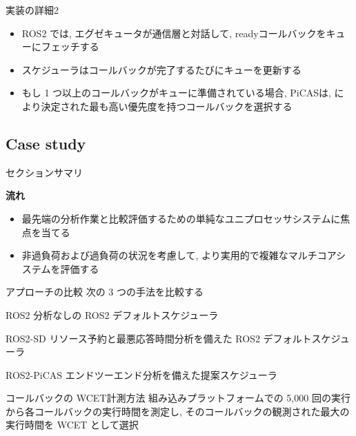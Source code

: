 \begin{frame}{実装の詳細2}
    \begin{itemize}
        \item ROS2 では, エグゼキュータが通信層と対話して, readyコールバックをキューにフェッチする
        \item スケジューラはコールバックが完了するたびにキューを更新する
        \item もし 1 つ以上のコールバックがキューに準備されている場合, PiCASは,  により決定された最も高い優先度を持つコールバックを選択する
    \end{itemize}
\end{frame}


\subsection{Case study}
\label{ssec: case study}

\begin{frame}{セクションサマリ}
    \begin{itembox}[l]{\textbf{流れ}}
        \begin{itemize}
            \item 最先端の分析作業と比較評価するための単純なユニプロセッサシステムに焦点を当てる
            \item 非過負荷および過負荷の状況を考慮して, より実用的で複雑なマルチコアシステムを評価する
        \end{itemize}
    \end{itembox}
\end{frame}

\begin{frame}{アプローチの比較}
    次の 3 つの手法を比較する
    \begin{block}{ROS2}
        分析なしの ROS2 デフォルトスケジューラ
    \end{block}
    \begin{block}{ROS2-SD}
        リソース予約と最悪応答時間分析を備えた ROS2 デフォルトスケジューラ~\cite{casini2019response}
    \end{block}
    \begin{block}{ROS2-PiCAS}
        エンドツーエンド分析を備えた提案スケジューラ
    \end{block}
\end{frame}

\begin{frame}{コールバックの WCET計測方法}
    組み込みプラットフォームでの 5,000 回の実行から各コールバックの実行時間を測定し, そのコールバックの観測された最大の実行時間を WCET として選択
\end{frame}


